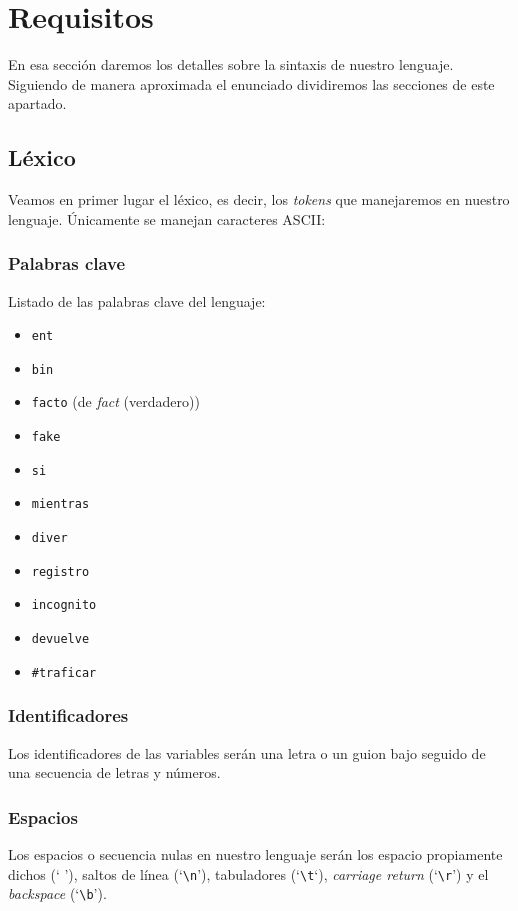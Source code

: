 \section{Requisitos}
En esa sección daremos los detalles sobre la sintaxis de nuestro lenguaje.
Siguiendo de manera aproximada el enunciado dividiremos las secciones de este
apartado.

\subsection{Léxico}
Veamos en primer lugar el léxico, es decir, los \textit{tokens} que manejaremos
en nuestro lenguaje. Únicamente se manejan caracteres ASCII:
\subsubsection{Palabras clave}
Listado de las palabras clave del lenguaje:
\begin{itemize}
    \item \lstinline{ent}
    \item \lstinline{bin}
    \item \lstinline{facto} (de \textit{fact} (verdadero))
    \item \lstinline{fake}
    \item \lstinline{si}
    \item \lstinline{mientras}
    \item \lstinline{diver}
    \item \lstinline{registro}
    \item \lstinline{incognito}
    \item \lstinline{devuelve}
    \item \lstinline{#traficar}
\end{itemize}

\subsubsection{Identificadores}
Los identificadores de las variables serán una letra o un guion bajo seguido de
una secuencia de letras y números.

\subsubsection{Espacios}
Los espacios o secuencia nulas en nuestro lenguaje serán los espacio propiamente
dichos (` '), saltos de línea (`\lstinline{\n}'), tabuladores
(`\lstinline{\t}`), \textit{carriage return} (`\lstinline{\r}') y el
\textit{backspace} (`\lstinline{\b}').


